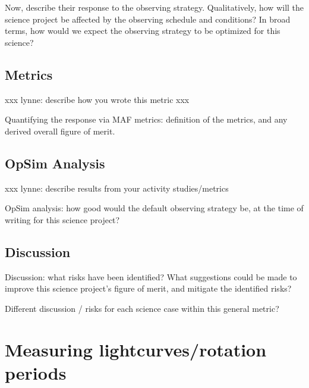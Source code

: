Now, describe their response to the observing strategy. Qualitatively,
how will the science project be affected by the observing schedule and
conditions? In broad terms, how would we expect the observing strategy
to be optimized for this science?



\subsection{Metrics}
\label{sec:\secname:metrics}

xxx lynne: describe how you wrote this metric xxx

Quantifying the response via MAF metrics: definition of the metrics,
and any derived overall figure of merit.



\subsection{OpSim Analysis}
\label{sec:\secname:analysis}

xxx lynne: describe results from your activity studies/metrics

OpSim analysis: how good would the default observing strategy be, at
the time of writing for this science project?



\subsection{Discussion}
\label{sec:\secname:discussion}

Discussion: what risks have been identified? What suggestions could be
made to improve this science project's figure of merit, and mitigate
the identified risks?

Different discussion / risks for each science case within this general metric?

\navigationbar


\section{Measuring lightcurves/rotation periods}
\def\secname{\chpname:lightcurves}\label{sec:\secname}

